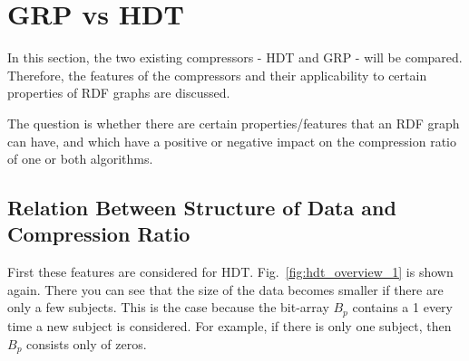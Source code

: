 %
%
%

\section{GRP vs HDT}\label{sec:approachGRPvsHDT}

In this section, the two existing compressors - HDT and GRP - will be compared. Therefore, the features of the compressors and their applicability to certain properties of RDF graphs are discussed.

The question is whether there are certain properties/features that an RDF graph can have, and which have a positive or negative impact on the compression ratio of one or both algorithms. 

\subsection{Relation Between Structure of Data and Compression Ratio}

First these features are considered for HDT. Fig.~\ref{fig:hdt_overview_1} is shown again. There you can see that the size of the data becomes smaller if there are only a few subjects. This is the case because the bit-array $B_p$ contains a 1 every time a new subject is considered. For example, if there is only one subject, then $B_p$ consists only of zeros.

